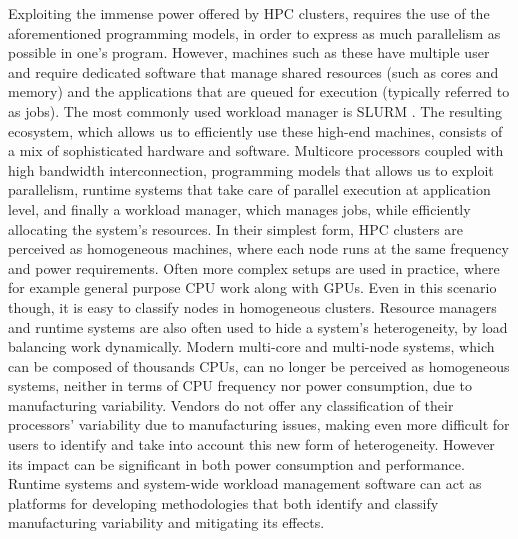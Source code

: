 Exploiting the immense power offered by HPC clusters, requires the use of the
aforementioned programming models, in order to express as much parallelism as possible in
one's program.  However, machines such as these have multiple user and require dedicated
software that manage shared resources (such as cores and memory) and the applications that
are queued for execution (typically referred to as jobs).  The most commonly used workload
manager is SLURM \cite{slurm_02}. The resulting ecosystem, which allows us to efficiently
use these high-end machines, consists of a mix of sophisticated hardware and software.
Multicore processors coupled with high bandwidth interconnection, programming models that
allows us to exploit parallelism, runtime systems that take care of parallel execution at
application level, and finally a workload manager, which manages jobs, while efficiently
allocating the system's resources.  In their simplest form, HPC clusters are perceived as
homogeneous machines, where each node runs at the same frequency and power requirements.
Often more complex setups are used in practice, where for example general purpose CPU work
along with GPUs.  Even in this scenario though, it is easy to classify nodes in
homogeneous clusters.  Resource managers and runtime systems are also often used to hide a
system's heterogeneity, by load balancing work dynamically.  Modern multi-core and
multi-node systems, which can be composed of thousands CPUs, can no longer be perceived as
homogeneous systems, neither in terms of CPU frequency nor power consumption, due to
manufacturing variability.  Vendors do not offer any classification of their processors'
variability due to manufacturing issues, making even more difficult for users to identify
and take into account this new form of heterogeneity.  However its impact can be
significant in both power consumption and performance.  Runtime systems and system-wide
workload management software can act as platforms for developing methodologies that both
identify and classify manufacturing variability and mitigating its effects.  


%
%

